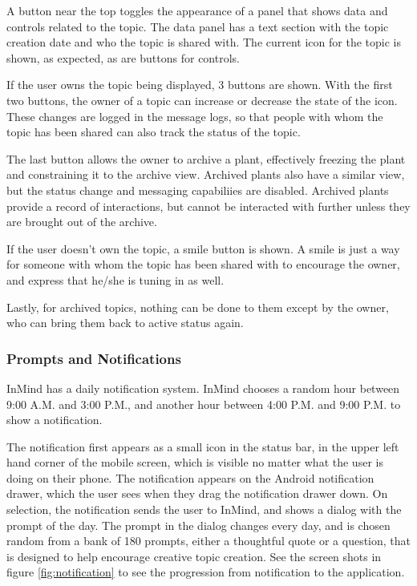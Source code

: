       A button near the top toggles the appearance of a panel that shows data and controls
      related to the topic.
      The data panel has a text section with the topic creation date and who the topic is shared with.
      The current icon for the topic is shown, as expected, as are buttons for controls.

      If the user owns the topic being displayed, 3 buttons are shown.
      With the first two buttons,
      the owner of a topic can increase or decrease the state of the icon.
      These changes are logged in the message logs,
      so that people with whom the topic has been shared
      can also track the status of the topic.

      The last button allows the owner to archive a plant,
      effectively freezing the plant and constraining it to the archive view.
      Archived plants also have a similar view,
      but the status change and messaging capabiliies are disabled.
      Archived plants provide a record of interactions,
      but cannot be interacted with further unless they are brought out of the archive.

      If the user doesn't own the topic, a smile button is shown.
      A smile is just a way for someone with whom the topic has been
      shared with to encourage the owner,
      and express that he/she is tuning in as well.

      Lastly, for archived topics,
      nothing can be done to them except by the owner,
      who can bring them back to active status again.

      \subsubsection{Prompts and Notifications}
      InMind has a daily notification system.
      InMind chooses a random hour between 9:00 A.M. and 3:00 P.M.,
      and another hour between 4:00 P.M. and 9:00 P.M. to show a notification.

      The notification first appears as a small icon in the status bar,
      in the upper left hand corner of
      the mobile screen, which is visible no matter what the user is doing on their phone.
      The notification appears on the Android notification drawer,
      which the user sees when they drag the notification drawer down.
      On selection,
      the notification sends the user to InMind,
      and shows a dialog with the prompt of the day.
      The prompt in the dialog changes every day,
      and is chosen random from a bank of 180 prompts,
      either a thoughtful quote or a question,
      that is designed to help encourage creative topic creation.
      See the screen shots in figure \ref{fig:notification} to see the progression
      from notification to the application.

